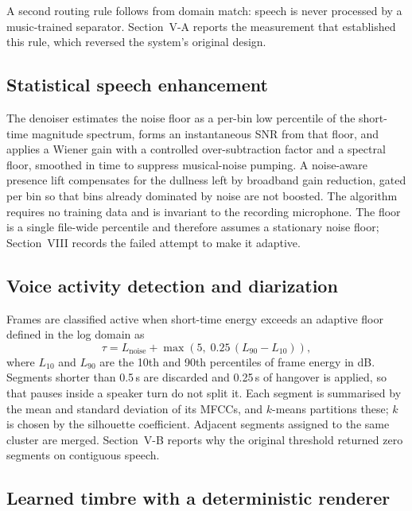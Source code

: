 \documentclass[conference]{IEEEtran}
\begin{document}
A second routing rule follows from domain match: speech is never processed by a
music-trained separator. Section~V-A reports the measurement that established
this rule, which reversed the system's original design.

\subsection{Statistical speech enhancement}

The denoiser estimates the noise floor as a per-bin low percentile of the
short-time magnitude spectrum, forms an instantaneous SNR from that floor, and
applies a Wiener gain with a controlled over-subtraction factor and a spectral
floor, smoothed in time to suppress musical-noise pumping. A noise-aware
presence lift compensates for the dullness left by broadband gain reduction,
gated per bin so that bins already dominated by noise are not boosted. The
algorithm requires no training data and is invariant to the recording
microphone. The floor is a single file-wide percentile and therefore assumes a
stationary noise floor; Section~VIII records the failed attempt to make it
adaptive.

\subsection{Voice activity detection and diarization}

Frames are classified active when short-time energy exceeds an adaptive floor
defined in the log domain as
\begin{equation}
\tau = L_{\mathrm{noise}} + \max\!\left(5,\; 0.25\,(L_{90} - L_{10})\right),
\end{equation}
where $L_{10}$ and $L_{90}$ are the 10th and 90th percentiles of frame energy in
dB. Segments shorter than 0.5\,s are discarded and 0.25\,s of hangover is applied,
so that pauses inside a speaker turn do not split it. Each segment is summarised
by the mean and standard deviation of its MFCCs, and $k$-means partitions these;
$k$ is chosen by the silhouette coefficient. Adjacent segments assigned to the
same cluster are merged. Section~V-B reports why the original threshold returned
zero segments on contiguous speech.

\subsection{Learned timbre with a deterministic renderer}
\end{document}
